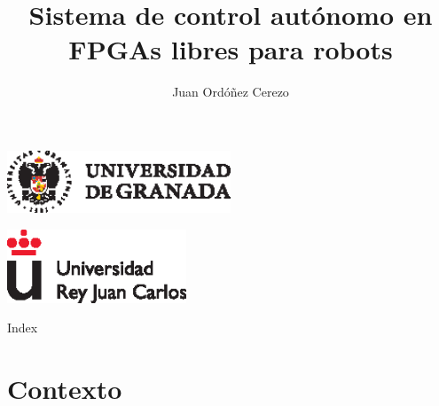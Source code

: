 \documentclass{beamer}
\title{Sistema de control autónomo en FPGAs libres para robots}
\subtitle{}
\author{Juan Ordóñez Cerezo\inst{1}}
\institute[Universidad de Granada] %
{
  \inst{1}%
  Universidad de Granada
}
\date{}
\begin{document}
\begin{frame}
  \begin{center}
  \includegraphics [width =0.5\textwidth ]{logo_ugr}
  \end{center}
    \begin{center}
	\includegraphics [width =0.4\textwidth ]{logo_rey}
	\end{center}
  \titlepage
\end{frame}

\begin{frame}{Index}
  \tableofcontents
\end{frame}

\section{Contexto}
\end{document}
